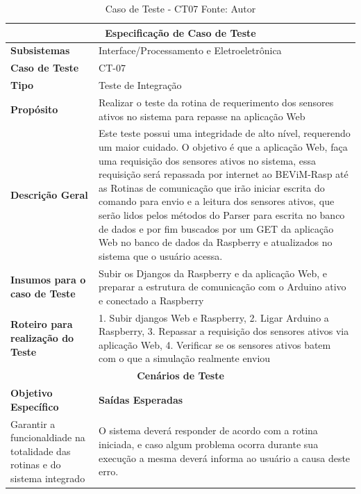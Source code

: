 \begin{table}[H]
    \begin{center}
        \begin{tabular}{|p{5cm}|p{12cm}|}
            \hline
            \multicolumn{2}{|c|}{\textbf{Especificação de Caso de Teste}} \\ \hline
                \textbf{Subsistemas}                               & Interface/Processamento e Eletroeletrônica \\ \hline
                \textbf{Caso de Teste}                             & CT-07 \\ \hline
                \textbf{Tipo}                                             & Teste de Integração \\ \hline
                \textbf{Propósito}                                     & Realizar o teste da rotina de requerimento dos sensores ativos no sistema para repasse na aplicação Web \\ \hline
                \textbf{Descrição Geral}                           & Este teste possui uma integridade de alto nível, requerendo um maior cuidado. O objetivo é que a aplicação Web, faça uma requisição dos sensores ativos no sistema, essa requisição será repassada por internet ao BEViM-Rasp até as Rotinas de comunicação que irão iniciar escrita do comando para envio e a leitura dos sensores ativos, que serão lidos pelos métodos do Parser para escrita no banco de dados e por fim buscados por um GET da aplicação Web no banco de dados da Raspberry e atualizados no sistema que o usuário acessa. \\ \hline
                \textbf{Insumos para o caso de Teste}    & Subir os Djangos da Raspberry e da aplicação Web, e preparar a estrutura de comunicação com o Arduino ativo e conectado a Raspberry \\ \hline
                \textbf{Roteiro para realização do Teste}&  1. Subir djangos Web e Raspberry, 2. Ligar Arduino a Raspberry, 3. Repassar a requisição dos sensores ativos via aplicação Web, 4. Verificar se os sensores ativos batem com o que a simulação realmente enviou \\ \hline
            \multicolumn{2}{|c|}{\textbf{Cenários de Teste}} \\ \hline
                \textbf{Objetivo Específico}                      & \textbf{Saídas Esperadas} \\ \hline
                Garantir a funcionaldiade na totalidade das rotinas e do sistema integrado & O sistema deverá responder de acordo com a rotina iniciada, e caso algum problema ocorra durante sua execução a mesma deverá informa ao usuário a causa deste erro. \\ \hline
        \end{tabular}
    \end{center}
    \caption[Caso de Teste - CT07]{Caso de Teste - CT07
    \protect Fonte: Autor}
    \label{CT-07}
\end{table}

